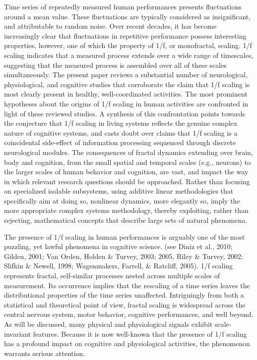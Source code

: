 \documentclass[12pt,]{book}
\begin{document}
Time series of repeatedly measured human performances presents fluctuations around a mean value. These fluctuations are typically considered as insignificant, and attributable to random noise. Over recent decades, it has become increasingly clear that fluctuations in repetitive performance possess interesting properties, however, one of which the property of 1/f, or monofractal, scaling. 1/f scaling indicates that a measured process extends over a wide range of timescales, suggesting that the measured process is assembled over all of these scales simultaneously. The present paper reviews a substantial number of neurological, physiological, and cognitive studies that corroborate the claim that 1/f scaling is most clearly present in healthy, well-coordinated activities. The most prominent hypotheses about the origins of 1/f scaling in human activities are confronted in light of these reviewed studies. A synthesis of this confrontation points towards the conjecture that 1/f scaling in living systems reflects the genuine complex nature of cognitive systems, and casts doubt over claims that 1/f scaling is a coincidental side-effect of information processing sequenced through discrete neurological modules. The consequences of fractal dynamics extending over brain, body and cognition, from the small spatial and temporal scales (e.g., neurons) to the larger scales of human behavior and cognition, are vast, and impact the way in which relevant research questions should be approached. Rather than focusing on specialized isolable subsystems, using additive linear methodologies that specifically aim at doing so, nonlinear dynamics, more elegantly so, imply the more appropriate complex systems methodology, thereby exploiting, rather than rejecting, mathematical concepts that describe large sets of natural phenomena.

The presence of 1/f scaling in human performances is arguably one of the most puzzling, yet lawful phenomena in cognitive science. (see Diniz et al., 2010; Gilden, 2001; Van Orden, Holden \& Turvey, 2003; 2005, Riley \& Turvey, 2002; Slifkin \& Newell, 1998; Wagenmakers, Farrell, \& Ratcliff, 2005). 1/f scaling represents fractal, self-similar processes nested across multiple scales of measurement. Its occurrence implies that the rescaling of a time series leaves the distributional properties of the time series unaffected. Intriguingly from both a statistical and theoretical point of view, fractal scaling is widespread across the central nervous system, motor behavior, cognitive performances, and well beyond. As will be discussed, many physical and physiological signals exhibit scale-invariant features. Because it is now well-known that the presence of 1/f scaling has a profound impact on cognitive and physiological activities, the phenomenon warrants serious attention.
\end{document}
